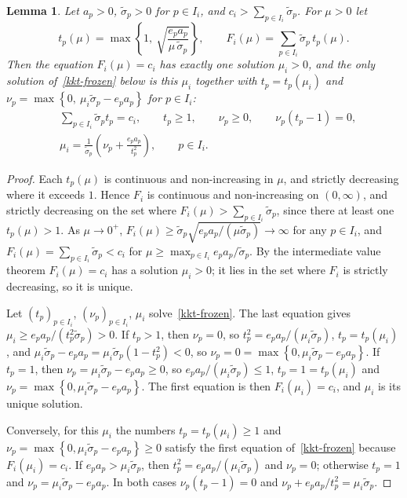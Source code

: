 \documentclass[11pt]{article}
\theoremstyle{plain}
\newtheorem{lemma}[theorem]{Lemma}
\theoremstyle{definition}
\theoremstyle{remark}
\numberwithin{equation}{section}
\numberwithin{figure}{section}
\numberwithin{table}{section}
\numberwithin{algorithm}{section}
\begin{document}
\begin{lemma}\label{frozen}
Let $a_p>0$, $\widetilde\sigma_p>0$ for $p\in I_i$, and
$c_i>\sum_{p\in I_i}\widetilde\sigma_p$. For $\mu>0$ let
\begin{equation}\label{t-of-mu}
t_p(\mu)=\max\left\{1,\ \sqrt{\frac{e_pa_p}{\mu\,\widetilde\sigma_p}}\right\},
\qquad
F_i(\mu)=\sum_{p\in I_i}\widetilde\sigma_p\,t_p(\mu).
\end{equation}
Then the equation $F_i(\mu)=c_i$ has exactly one solution $\mu_i>0$, and the
only solution of~\eqref{kkt-frozen} below is this $\mu_i$ together with
$t_p=t_p(\mu_i)$ and
$\nu_p=\max\left\{0,\ \mu_i\widetilde\sigma_p-e_pa_p\right\}$ for $p\in I_i$:
\begin{equation}\label{kkt-frozen}
\begin{aligned}
&\sum_{p\in I_i}\widetilde\sigma_pt_p=c_i,\qquad t_p\ge 1,\qquad \nu_p\ge 0,\qquad
\nu_p\left(t_p-1\right)=0,\\
&\mu_i=\frac{1}{\widetilde\sigma_p}\left(\nu_p+\frac{e_pa_p}{t_p^2}\right),
\qquad p\in I_i .
\end{aligned}
\end{equation}
\end{lemma}
\begin{proof}
Each $t_p(\mu)$ is continuous and non-increasing in $\mu$, and strictly
decreasing where it exceeds $1$. Hence $F_i$ is continuous and
non-increasing on $(0,\infty)$, and strictly decreasing on the set where
$F_i(\mu)>\sum_{p\in I_i}\widetilde\sigma_p$, since there at least one $t_p(\mu)>1$.
As $\mu\to 0^+$, $F_i(\mu)\ge\widetilde\sigma_p\sqrt{e_pa_p/(\mu\widetilde\sigma_p)}\to\infty$
for any $p\in I_i$, and $F_i(\mu)=\sum_{p\in I_i}\widetilde\sigma_p<c_i$ for
$\mu\ge\max_{p\in I_i}e_pa_p/\widetilde\sigma_p$. By the intermediate value
theorem $F_i(\mu)=c_i$ has a solution $\mu_i>0$; it lies in the set where $F_i$ is
strictly decreasing, so it is unique.

Let $\left(t_p\right)_{p\in I_i}$, $\left(\nu_p\right)_{p\in I_i}$, $\mu_i$
solve~\eqref{kkt-frozen}. The last equation gives
$\mu_i\ge e_pa_p/(t_p^2\widetilde\sigma_p)>0$. If $t_p>1$, then $\nu_p=0$,
so $t_p^2=e_pa_p/(\mu_i\widetilde\sigma_p)$, $t_p=t_p(\mu_i)$, and
$\mu_i\widetilde\sigma_p-e_pa_p=\mu_i\widetilde\sigma_p\left(1-t_p^2\right)<0$,
so $\nu_p=0=\max\left\{0,\mu_i\widetilde\sigma_p-e_pa_p\right\}$. If $t_p=1$, then
$\nu_p=\mu_i\widetilde\sigma_p-e_pa_p\ge 0$, so
$e_pa_p/(\mu_i\widetilde\sigma_p)\le 1$, $t_p=1=t_p(\mu_i)$ and
$\nu_p=\max\left\{0,\mu_i\widetilde\sigma_p-e_pa_p\right\}$. The first
equation is then $F_i(\mu_i)=c_i$, and $\mu_i$ is its unique solution.

Conversely, for this $\mu_i$ the numbers $t_p=t_p(\mu_i)\ge 1$ and
$\nu_p=\max\left\{0,\mu_i\widetilde\sigma_p-e_pa_p\right\}\ge 0$ satisfy
the first equation of~\eqref{kkt-frozen} because $F_i(\mu_i)=c_i$. If
$e_pa_p>\mu_i\widetilde\sigma_p$, then $t_p^2=e_pa_p/(\mu_i\widetilde\sigma_p)$
and $\nu_p=0$; otherwise $t_p=1$ and $\nu_p=\mu_i\widetilde\sigma_p-e_pa_p$.
In both cases $\nu_p\left(t_p-1\right)=0$ and
$\nu_p+e_pa_p/t_p^2=\mu_i\widetilde\sigma_p$.
\end{proof}
\end{document}
